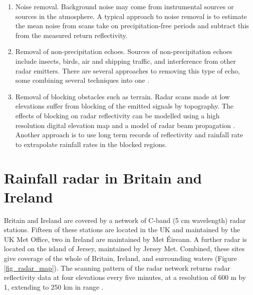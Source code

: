 \begin{enumerate}
\item Noise removal. Background noise may come from instrumental sources or sources in the atmosphere. A typical approach to noise removal is to estimate the mean noise from scans take on precipitation-free periods and subtract this from the measured return reflectivity.

\item Removal of non-precipitation echoes. Sources of non-precipitation echoes include insects, birds, air and shipping traffic, and interference from other radar emitters. There are several approaches to removing this type of echo, some combining several techniques into one \citep{germann2006radar,rico2008classification}.

\item Removal of blocking obstacles such as terrain. Radar scans made at low elevations suffer from blocking of the emitted signals by topography. The effects of blocking on radar reflectivity can be modelled using a high resolution digital elevation map and a model of radar beam propagation \citep{pellarin2002hydrologic}. Another approach is to use long term records of reflectivity and rainfall rate to extrapolate rainfall rates in the blocked regions.

\end{enumerate}

\section{Rainfall radar in Britain and Ireland}

Britain and Ireland are covered by a network of C-band (5 cm wavelength) radar stations. Fifteen of these stations are located in the UK and maintained by the UK Met Office, two in Ireland are maintained by Met {\'E}ireann. A further radar is located on the island of Jersey, maintained by Jersey Met. Combined, these sites give coverage of the whole of Britain, Ireland, and surrounding waters (Figure \ref{fig_radar_map}). The scanning pattern of the radar network returns radar reflectivity data at four elevations every five minutes, at a resolution of 600 m by 1\degree, extending to 250 km in range \citep{harrison2012radar}. 



